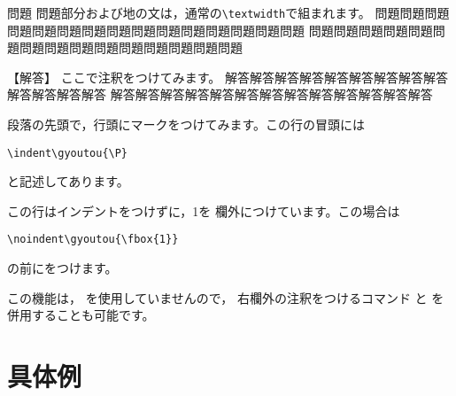 \documentclass[a4j,fleqn]{jarticle}
\begin{document}
\hidarityuukeisenfalse
\begin{itembox}{問題}
問題部分および地の文は，通常の\verb+\textwidth+で組まれます。
問題問題問題問題問題問題問題問題問題問題問題問題問題問題問題
問題問題問題問題問題問題問題問題問題問題問題問題問題問題問題
\end{itembox}
\begin{tyuukai}
【解答】
ここで注釈をつけてみます。
解答解答解答解答解答解答解答解答解答解答解答解答解答
解答解答解答解答解答解答解答解答解答解答解答解答解答

\indent
\gyoutou{\P}
段落の先頭で，行頭にマークをつけてみます。この行の冒頭には
\begin{jquote}
\begin{verbatim}
\indent\gyoutou{\P}
\end{verbatim}
\end{jquote}
と記述してあります。

\noindent{}この行はインデントをつけずに，\fbox1を
欄外につけています。この場合は
\begin{jquote}
\begin{verbatim}
\noindent\gyoutou{\fbox{1}}
\end{verbatim}
\end{jquote}
の前にをつけます。

この機能は， を使用していませんので，
右欄外の注釈をつけるコマンド  と  を
併用することも可能です。　　　　
\end{tyuukai}
\clearpage

\section{具体例}
\end{document}

